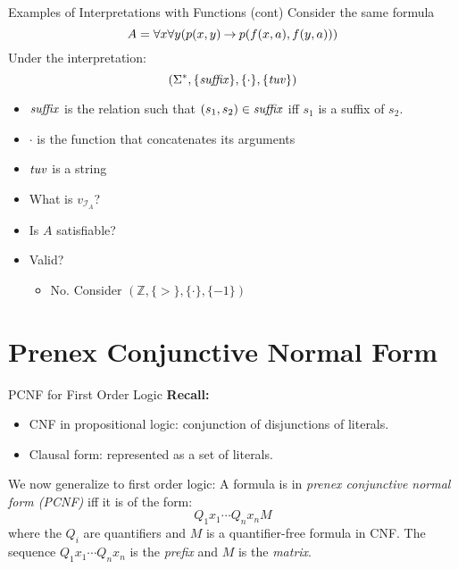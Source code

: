 \documentclass[style=sailor,size=12pt,mode=present]{powerdot}
\newcommand{\id}[1]{\mbox{\it #1\/}}
\theoremstyle{definition}
\newenvironment{defn}[1]
  {\renewcommand\theinnerdefn{#1}\innerdefn}
  {\endinnerdefn}
\newenvironment{ex}[1]
  {\renewcommand\theinnerexample{#1}\innerexample}
  {\endinnerexample}
\newcommand{\bb}[1]{\mathbb{#1}}
\newcommand{\Z}{\bb{Z}}
\begin{document}
\begin{wideslide}[bm=,toc=]{Examples of Interpretations with Functions (cont)}
\begin{ex}{9.4}[cont]
Consider the same formula
\[
  A = \forall x \forall y(p(x,y) \mathbin{\rightarrow} p(f(x,a),f(y,a)))
\]
Under the interpretation:
\[
  (\Sigma^*,\{\id{suffix}\}, \{\cdot\}, \{\id{tuv}\}) 
\]
\vspace{-4ex}
\end{ex}
\begin{itemize}
\item $\id{suffix}$ is the relation such that $(s_1,s_2) \in \id{suffix}$ iff
$s_1$ is a suffix of $s_2$.
\item $\cdot$ is the function that concatenates its arguments
\item $\id{tuv}$ is a string
\item What is $v_{\mathcal{I}_A}$?
\item Is $A$ satisfiable?
\item Valid?
\begin{itemize}
\item<2-> No. Consider $(\Z,\{>\},\{\cdot\},\{-1\})$
\end{itemize}
\end{itemize}
\end{wideslide}

\section[slide=false]{Prenex Conjunctive Normal Form}

\begin{wideslide}[bm=,toc=]{PCNF for First Order Logic}
{\bf Recall:}
\begin{itemize}
\item CNF in propositional logic: conjunction of disjunctions of literals.
\item Clausal form: represented as a set of literals.
\end{itemize}
We now generalize to first order logic:
\begin{defn}{9.9}
A formula is in \emph{prenex conjunctive normal form (PCNF)} iff it is of the
form:
\[
  Q_1x_1\cdots Q_n x_n M
  \]
  where the $Q_i$ are quantifiers and $M$ is a quantifier-free formula in CNF.
  The sequence $Q_1x_1 \cdots Q_n x_n$ is the \emph{prefix} and $M$ is the
  \emph{matrix}.
\end{defn}

\end{wideslide}
\end{document}
